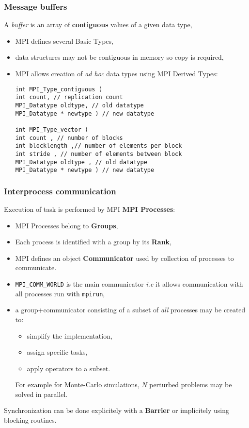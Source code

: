 \begin{frame}[fragile]
  \frametitle{Message buffers}

\begin{center}
A \textit{buffer} is an array of \textbf{contiguous} values of a given data type,
\end{center}

\begin{itemize}
\item MPI defines several Basic Types,
\item data structures may not be contiguous in memory so copy is required,
\item MPI allows creation of \textit{ad hoc} data types using MPI Derived Types:

\begin{lstlisting}[style=c,morekeywords={MPI_Type_contiguous,MPI_Type_vector,MPI_Datatype}]
int MPI_Type_contiguous (
int count, // replication count
MPI_Datatype oldtype, // old datatype
MPI_Datatype * newtype ) // new datatype

int MPI_Type_vector (
int count , // number of blocks
int blocklength ,// number of elements per block
int stride , // number of elements between block
MPI_Datatype oldtype , // old datatype
MPI_Datatype * newtype ) // new datatype

\end{lstlisting}
\end{itemize}
\end{frame}


\begin{frame}[fragile]
\frametitle{Interprocess communication}

Execution of task is performed by MPI \textbf{MPI Processes}:
\begin{itemize}
\item MPI Processes belong to \textbf{Groups},
\item Each process is identified with a group by its \textbf{Rank},
\item MPI defines an object \textbf{Communicator} used by collection of processes to communicate.
\end{itemize}

\medskip
\begin{itemize}
\item \texttt{MPI\_COMM\_WORLD} is the main communicator \textit{i.e} it allows communication with all processes run with \texttt{mpirun},
\item a group+communicator consisting of a subset of \textit{all} processes may be created to:
\begin{itemize}
\item simplify the implementation,
\item assign specific tasks,
\item apply operators to a subset.
\end{itemize}
For example for Monte-Carlo simulations, $N$ perturbed problems may be solved in parallel.
\end{itemize}

\medskip
Synchronization can be done explicitely with a \textbf{Barrier} or implicitely using blocking routines.
\end{frame}


